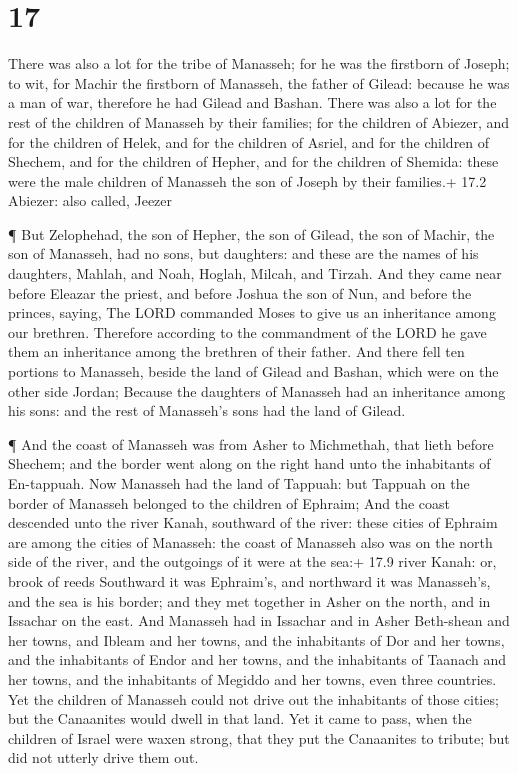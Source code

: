 \hypertarget{section-16}{%
\section{17}\label{section-16}}

 There was also a lot for the tribe of Manasseh; for he was
the firstborn of Joseph; to wit, for Machir the firstborn of Manasseh,
the father of Gilead: because he was a man of war, therefore he had
Gilead and Bashan.  There was also a lot for the rest of the
children of Manasseh by their families; for the children of Abiezer, and
for the children of Helek, and for the children of Asriel, and for the
children of Shechem, and for the children of Hepher, and for the
children of Shemida: these were the male children of Manasseh the son of
Joseph by their families.+ 17.2 Abiezer: also called, Jeezer

 ¶ But Zelophehad, the son of Hepher, the son of Gilead, the
son of Machir, the son of Manasseh, had no sons, but daughters: and
these are the names of his daughters, Mahlah, and Noah, Hoglah, Milcah,
and Tirzah.  And they came near before Eleazar the priest,
and before Joshua the son of Nun, and before the princes, saying, The
LORD commanded Moses to give us an inheritance among our brethren.
Therefore according to the commandment of the LORD he gave them an
inheritance among the brethren of their father.  And there
fell ten portions to Manasseh, beside the land of Gilead and Bashan,
which were on the other side Jordan;  Because the daughters
of Manasseh had an inheritance among his sons: and the rest of
Manasseh's sons had the land of Gilead.

 ¶ And the coast of Manasseh was from Asher to Michmethah,
that lieth before Shechem; and the border went along on the right hand
unto the inhabitants of En-tappuah.  Now Manasseh had the
land of Tappuah: but Tappuah on the border of Manasseh belonged to the
children of Ephraim;  And the coast descended unto the river
Kanah, southward of the river: these cities of Ephraim are among the
cities of Manasseh: the coast of Manasseh also was on the north side of
the river, and the outgoings of it were at the sea:+ 17.9 river Kanah:
or, brook of reeds  Southward it was Ephraim's, and
northward it was Manasseh's, and the sea is his border; and they met
together in Asher on the north, and in Issachar on the east.
 And Manasseh had in Issachar and in Asher Beth-shean and
her towns, and Ibleam and her towns, and the inhabitants of Dor and her
towns, and the inhabitants of Endor and her towns, and the inhabitants
of Taanach and her towns, and the inhabitants of Megiddo and her towns,
even three countries.  Yet the children of Manasseh could
not drive out the inhabitants of those cities; but the Canaanites would
dwell in that land.  Yet it came to pass, when the children
of Israel were waxen strong, that they put the Canaanites to tribute;
but did not utterly drive them out.

